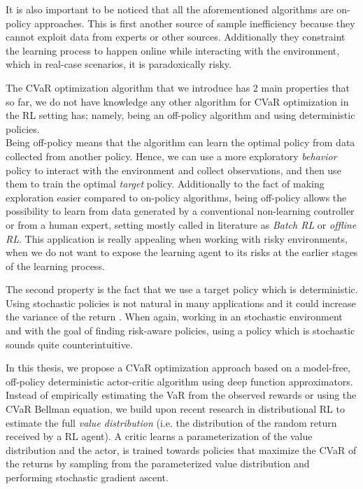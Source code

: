 It is also important to be noticed that all the aforementioned algorithms are on-policy approaches.
This is first another source of sample inefficiency
because they cannot exploit data from experts or other sources. Additionally they
constraint the learning process to happen online while interacting with the environment,
which in real-case scenarios, it is paradoxically risky.

The CVaR optimization algorithm that we introduce has 2 main properties that so far,
we do not have knowledge any other algorithm for CVaR optimization in the RL setting has; 
namely, being an off-policy algorithm and using deterministic policies.\\
Being off-policy means that the algorithm can learn the optimal policy from data collected
from another policy. Hence, we can use a more exploratory \textit{behavior} policy to interact
with the environment and collect observations, and then use them to train
the optimal \textit{target} policy. 
Additionally to the fact of making exploration easier compared to on-policy algorithms,
being off-policy allows the possibility to learn from data generated by a conventional
non-learning controller or from a human expert, setting mostly called in literature as
\textit{Batch RL} or \textit{offline RL}.
This application is really appealing when working with risky environments, when we do
not want to expose the learning agent to its risks at the earlier stages of the learning
process.


The second property is the fact that we use a target policy which is deterministic.
Using stochastic policies is not natural in many applications and it
could increase the variance of the return .
When again, working in an stochastic 
environment and with the goal of finding risk-aware policies, using a policy which is stochastic 
sounds quite counterintuitive.

In this thesis, we propose a CVaR optimization approach based on a model-free, off-policy
deterministic actor-critic algorithm using deep function approximators. 
Instead of empirically estimating the VaR from the observed rewards or using the CVaR
Bellman equation, we build upon recent research in distributional RL 
\citep{Bellemare2017,Dabney2018a,Dabney2018b}
to estimate the full
\textit{value distribution} (i.e. the distribution of the random return received by a RL agent).
A critic learns a parameterization of the value distribution and 
the actor, is trained towards policies that maximize the CVaR of the returns 
by sampling from the parameterized value distribution and performing stochastic gradient ascent.

